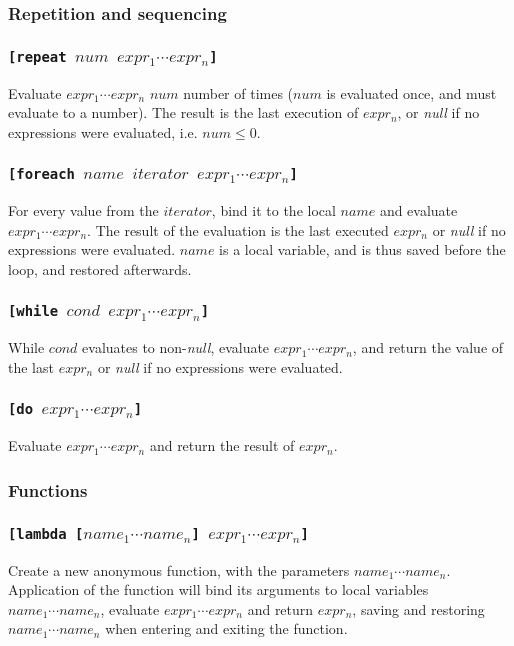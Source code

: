 \documentclass[11pt]{report}
\begin{document}
\subsubsection{Repetition and sequencing}
\subsubsection*{\tt{[repeat }$num$ $expr_1 \cdots expr_n$\tt{]}}
Evaluate $expr_1 \cdots expr_n$ $num$ number of times ($num$ is evaluated once, and must evaluate to a number). The result is the last execution of $expr_n$, or \textit{null} if no expressions were evaluated, i.e. $num \leq 0$.

\subsubsection*{\tt{[foreach }$name$ $iterator$ $expr_1 \cdots expr_n$\tt{]}}
For every value from the $iterator$, bind it to the local $name$ and evaluate $expr_1 \cdots expr_n$. The result of the evaluation is the last executed $expr_n$ or \textit{null} if no expressions were evaluated. $name$ is a local variable, and is thus saved before the loop, and restored afterwards.

\subsubsection*{\tt{[while }$cond$ $expr_1 \cdots expr_n$\tt{]}}
While $cond$ evaluates to non-\textit{null}, evaluate $expr_1 \cdots expr_n$, and return the value of the last $expr_n$ or \textit{null} if no expressions were evaluated.


\subsubsection*{\tt{[do }$expr_1 \cdots expr_n$\tt{]}}
Evaluate $expr_1 \cdots expr_n$ and return the result of $expr_n$.


\subsubsection{Functions}
\subsubsection*{\tt{[lambda [}$name_1 \cdots name_n$\tt{]} $expr_1 \cdots expr_n$\tt{]}}
Create a new anonymous function, with the parameters $name_1\cdots name_n$. Application of the function will bind its arguments to local variables $name_1\cdots name_n$, evaluate $expr_1\cdots expr_n$ and return $expr_n$, saving and restoring $name_1\cdots name_n$ when entering and exiting the function.
\end{document}

